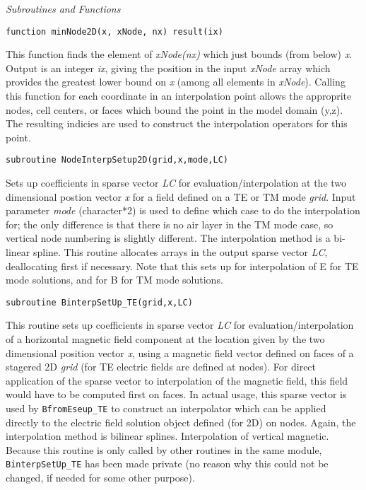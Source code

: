 \documentclass[12pt]{article}
\begin{document}
\noindent
{\it Subroutines and Functions}

\begin{verbatim}
function minNode2D(x, xNode, nx) result(ix)
\end{verbatim}

This function finds the element of {\it xNode(nx)}
which just bounds (from below) {\it x}.  Output is an
integer {\it ix}, giving the position in the input
{\it xNode} array which provides the greatest lower
bound on {\it x} (among all elements in {\it xNode}).
Calling this function for each coordinate in
an interpolation point allows the approprite
nodes, cell centers, or faces which bound the
point in the model domain (y,z).  The resulting indicies
are used to construct the interpolation operators for
this point.

\begin{verbatim}
subroutine NodeInterpSetup2D(grid,x,mode,LC)
\end{verbatim}

Sets up coefficients in sparse vector {\it LC} for evaluation/interpolation
at the two dimensional postion vector {\it x} for a field defined on a 
TE or TM mode {\it grid}.
Input parameter {\it mode} (character*2) is used to define which
case to do the interpolation for; the only difference is that there
is no air layer in the TM mode case, so vertical node numbering
is slightly different.  The interpolation method is
a bi-linear spline.  This routine allocates arrays in 
the output sparse vector {\it LC}, deallocating first if
necessary.  Note that this sets up for interpolation of E 
for TE mode solutions, and for B for TM mode solutions.

\begin{verbatim}
subroutine BinterpSetUp_TE(grid,x,LC)
\end{verbatim}

This routine sets up coefficients in sparse vector {\it LC} for
evaluation/interpolation of a horizontal magnetic field component 
at the location given by the two dimensional position vector {\it x},
using a magnetic field vector defined on faces of a stagered
2D {\it grid} (for TE electric fields are defined at nodes).
For direct application of the sparse vector to interpolation of
the magnetic field, this field would have to be computed first
on faces.  In actual usage, this sparse vector is used by
\verb|BfromEseup_TE| to construct an interpolator which can be applied
directly to the electric field solution object defined (for 2D)
on nodes.  Again, the interpolation method is bilinear splines.
Interpolation of vertical magnetic.  Because this routine
is only called by other routines in the same module,
\verb|BinterpSetUp_TE| has been made private (no reason why this
could not be changed, if needed for some other purpose).
\end{document}
